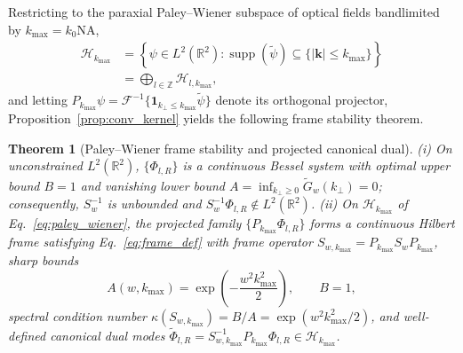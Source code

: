 \documentclass[aps,pra,onecolumn,notitlepage,11pt,tightenlines,amsmath,amssymb,floatfix,longbibliography]{revtex4-2}
\providecommand{\abs}[1]{\lvert#1\rvert}
\newtheorem{theorem}{Theorem}
\begin{document}
Restricting to the paraxial Paley--Wiener subspace of optical fields bandlimited by $k_{\max} = k_0 \mathrm{NA}$,
\begin{align}
\mathcal{H}_{k_{\max}} &= \left\{\psi \in L^2(\mathbb{R}^2) : \operatorname{supp}(\widetilde{\psi}) \subseteq \{\abs{\mathbf{k}} \le k_{\max}\}\right\} \nonumber \\
&= \bigoplus_{l\in\mathbb{Z}} \mathcal{H}_{l,k_{\max}},
\label{eq:paley_wiener}
\end{align}
and letting $P_{k_{\max}}\psi = \mathcal{F}^{-1}\{\mathbf{1}_{k_\perp \le k_{\max}}\widetilde{\psi}\}$ denote its orthogonal projector, Proposition~\ref{prop:conv_kernel} yields the following frame stability theorem.

\begin{theorem}[Paley--Wiener frame stability and projected canonical dual]
\label{thm:pw_bounds}
(i) On unconstrained $L^2(\mathbb{R}^2)$, $\{\Phi_{l,R}\}$ is a continuous Bessel system with optimal upper bound $B=1$ and vanishing lower bound $A = \inf_{k_\perp \ge 0} \widetilde{G}_w(k_\perp) = 0$; consequently, $S_w^{-1}$ is unbounded and $S_w^{-1}\Phi_{l,R} \notin L^2(\mathbb{R}^2)$. (ii) On $\mathcal{H}_{k_{\max}}$ of Eq.~\eqref{eq:paley_wiener}, the projected family $\{P_{k_{\max}}\Phi_{l,R}\}$ forms a continuous Hilbert frame satisfying Eq.~\eqref{eq:frame_def} with frame operator $S_{w,k_{\max}} = P_{k_{\max}} S_w P_{k_{\max}}$, sharp bounds
\begin{equation}
A(w, k_{\max}) = \exp\!\left(-\frac{w^2 k_{\max}^2}{2}\right), \qquad B = 1,
\label{eq:optimal_bounds}
\end{equation}
spectral condition number $\kappa(S_{w,k_{\max}}) = B/A = \exp(w^2 k_{\max}^2/2)$, and well-defined canonical dual modes $\widetilde{\Phi}_{l,R} = S_{w,k_{\max}}^{-1} P_{k_{\max}}\Phi_{l,R} \in \mathcal{H}_{k_{\max}}$.
\end{theorem}
\end{document}
